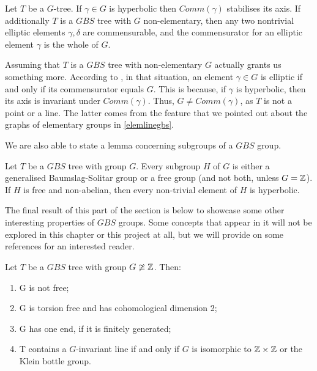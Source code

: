 \begin{lemma}\label{ellipticcomm}
    Let $T$ be a $G$-tree. If $\gamma \in G$ is hyperbolic then $Comm(\gamma)$ stabilises its axis. If additionally $T$ is a $GBS$ tree with $G$ non-elementary, then any two nontrivial elliptic elements $\gamma,\delta$ are commensurable, and the commensurator for an elliptic element $\gamma$ is the whole of $G$.
\end{lemma}

\begin{remark}
    Assuming that $T$ is a $GBS$ tree with non-elementary $G$ actually grants us something more. According to \cite[2.1]{Le07}, in that situation, an element $\gamma \in G$ is elliptic if and only if its commensurator equals $G$. This is because, if $\gamma$ is hyperbolic, then its axis is invariant under $Comm(\gamma)$. Thus, $G \neq Comm(\gamma)$, as $T$ is not a point or a line. The latter comes from the feature that we pointed out about the graphs of elementary groups in \ref{elemlinegbs}.
\end{remark}

We are also able to state a lemma concerning subgroups of a $GBS$ group.

\begin{lemma}
    Let $T$ be a $GBS$ tree with group $G$. Every subgroup $H$ of $G$ is either a generalised Baumslag-Solitar group or a free group (and not both, unless $G = \mathbb{Z}$). If $H$ is free and non-abelian, then every non-trivial element of $H$ is hyperbolic.
\end{lemma}

The final result of this part of the section is below to showcase some other interesting properties of $GBS$ groups. Some concepts that appear in it will not be explored in this chapter or this project at all, but we will provide on some references for an interested reader.

\begin{lemma}
    Let $T$ be a $GBS$ tree with group $G \ncong \mathbb{Z}$. Then:
   \begin{enumerate}
        \item G is not free;
        \item G is torsion free and has cohomological dimension 2;
        \item G has one end, if it is finitely generated;
        \item T contains a $G$-invariant line if and only if $G$ is isomorphic to $\mathbb{Z} \times \mathbb{Z}$ or the Klein bottle group.
    \end{enumerate}  
\end{lemma}

